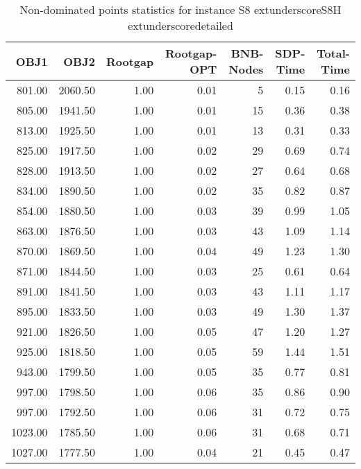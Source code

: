 \begin{table}
\caption{Non-dominated points statistics for instance S8	extunderscoreS8H	extunderscoredetailed}
\label{tab:stats/S8_S8H_detailed}
\begin{tabular}{rrrrrrr}
\toprule
OBJ1 & OBJ2 & Rootgap & Rootgap-OPT & BNB-Nodes & SDP-Time & Total-Time \\
\midrule
801.00 & 2060.50 & 1.00 & 0.01 & 5 & 0.15 & 0.16 \\
805.00 & 1941.50 & 1.00 & 0.01 & 15 & 0.36 & 0.38 \\
813.00 & 1925.50 & 1.00 & 0.01 & 13 & 0.31 & 0.33 \\
825.00 & 1917.50 & 1.00 & 0.02 & 29 & 0.69 & 0.74 \\
828.00 & 1913.50 & 1.00 & 0.02 & 27 & 0.64 & 0.68 \\
834.00 & 1890.50 & 1.00 & 0.02 & 35 & 0.82 & 0.87 \\
854.00 & 1880.50 & 1.00 & 0.03 & 39 & 0.99 & 1.05 \\
863.00 & 1876.50 & 1.00 & 0.03 & 43 & 1.09 & 1.14 \\
870.00 & 1869.50 & 1.00 & 0.04 & 49 & 1.23 & 1.30 \\
871.00 & 1844.50 & 1.00 & 0.03 & 25 & 0.61 & 0.64 \\
891.00 & 1841.50 & 1.00 & 0.03 & 43 & 1.11 & 1.17 \\
895.00 & 1833.50 & 1.00 & 0.03 & 49 & 1.30 & 1.37 \\
921.00 & 1826.50 & 1.00 & 0.05 & 47 & 1.20 & 1.27 \\
925.00 & 1818.50 & 1.00 & 0.05 & 59 & 1.44 & 1.51 \\
943.00 & 1799.50 & 1.00 & 0.05 & 35 & 0.77 & 0.81 \\
997.00 & 1798.50 & 1.00 & 0.06 & 35 & 0.86 & 0.90 \\
997.00 & 1792.50 & 1.00 & 0.06 & 31 & 0.72 & 0.75 \\
1023.00 & 1785.50 & 1.00 & 0.06 & 31 & 0.68 & 0.71 \\
1027.00 & 1777.50 & 1.00 & 0.04 & 21 & 0.45 & 0.47 \\
\bottomrule
\end{tabular}
\end{table}
